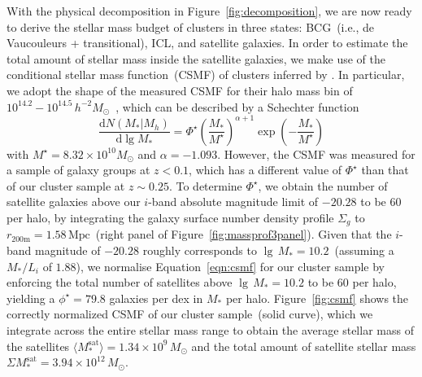 \documentclass[fleqn,usenatbib]{mnras}
\def\mrm{\mathrm}
\newcommand{\sigg}{\Sigma_g}
\newcommand{\dd}{\mathrm{d}}
\newcommand{\mpc}{\mathrm{Mpc}}
\newcommand{\msol}{M_{\odot}}
\newcommand{\hhmsol}{h^{-2}M_{\odot}}
\begin{document}
With the physical decomposition in Figure~\ref{fig:decomposition}, we are
now ready to derive the stellar mass budget of clusters in three states:
BCG~(i.e., de Vaucouleurs + transitional), ICL, and satellite galaxies. In
order to estimate the total amount of stellar mass inside the satellite
galaxies, we make use of the conditional stellar mass function~(CSMF) of
clusters inferred by \citet{Yang2012}.  In particular, we adopt the shape
of the measured CSMF for their halo mass bin of
$10^{14.2}{-}10^{14.5}\,\hhmsol$~\citep[c.f., column 9, table 7
of][]{Yang2012}, which can be described by a Schechter function
\begin{equation}
    \frac{\dd N(M_* | M_h)}{\dd\lg M_*} = \Phi^{\star} \left( \frac{
    M_*}{M^{\star}} \right)^{\alpha+1} \exp \left( -
  \frac{M_*}{M^{\star} } \right)
    \label{eqn:csmf}
\end{equation}
with $M^{\star}{=}8.32{\times}10^{10}\msol$ and $\alpha{=}{-}1.093$.
However, the \citeauthor{Yang2012} CSMF was measured for a sample of galaxy
groups at $z{<}0.1$, which has a different value of $\Phi^{\star}$ than
that of our cluster sample at $z{\sim}0.25$. To determine $\Phi^{\star}$,
we obtain the number of satellite galaxies above our $i$-band absolute
magnitude limit of $-20.28$ to be $60$ per halo, by integrating the galaxy
surface number density profile $\sigg$ to
$r_{200\mrm{m}}{=}1.58\,\mpc$~(right panel of
Figure~\ref{fig:massprof3panel}). Given that the $i$-band magnitude of
$-20.28$ roughly corresponds to $\lg\,M_*{=}10.2$~(assuming a $M_*/L_i$ of
$1.88$), we normalise Equation~\ref{eqn:csmf} for our cluster sample by
enforcing the total number of satellites above $\lg\,M_*{=}10.2$ to be $60$
per halo, yielding a $\phi^{\star}{=}79.8$ galaxies per dex in $M_*$ per
halo.  Figure~\ref{fig:csmf} shows the correctly normalized CSMF of our
cluster sample~(solid curve), which we integrate across the entire stellar
mass range to obtain the average stellar mass of the satellites
$\langle{M_*^{\mathrm{sat}}}\rangle{=}1.34{\times} 10^9\,\msol$ and the
total amount of satellite stellar mass $\Sigma
M_*^{\mathrm{sat}}{=}3.94{\times}10^{12}\,\msol$.
\end{document}
